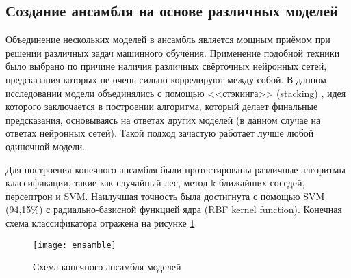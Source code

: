 \subsection{Создание ансамбля на основе различных моделей}
Объединение нескольких моделей в ансамбль является мощным приёмом при решении различных задач машинного обучения.
Применение подобной техники было выбрано по причине наличия различных свёрточных нейронных сетей, предсказания которых
не очень сильно коррелируют между собой. В данном исследовании модели объединялись с помощью <<стэкинга>> (stacking)
\cite{Wolpert92stackedgeneralization}, идея которого заключается в построении алгоритма, который делает финальные 
предсказания, основываясь на ответах других моделей (в данном случае на ответах нейронных сетей). Такой подход зачастую
работает лучше любой одиночной модели.

Для построения конечного ансамбля были протестированы различные алгоритмы классификации, такие как случайный лес, 
метод k ближайших соседей, персептрон и SVM. Наилучшая точность была достигнута с помощью SVM (94,15\%) с радиально-базисной
функцией ядра (RBF kernel function). Конечная схема классификатора отражена на рисунке \ref{fig:ansamble}.

\begin{figure}[H]
    \centering
    \texttt{[image: ensamble]}
    \caption{Схема конечного ансамбля моделей}
    \label{fig:ansamble}
\end{figure}